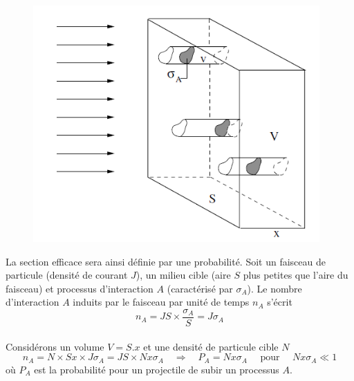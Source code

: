 	\begin{figure}
	\includegraphics[scale=0.35]{ch1/image5.png}
	\end{figure}
La section efficace sera ainsi définie par une probabilité. Soit un faisceau de particule
(densité de courant $J$), un milieu cible (aire $S$ plus petites que l'aire du faisceau)
et processus d'interaction $A$ (caractérisé par $\sigma_A$). Le nombre d'interaction $A$ 
induits par le faisceau par unité de temps $n_A$ s'écrit
\begin{equation}
n_A=JS\times\frac{\sigma_A}{S}=J\sigma_A
\end{equation}\ \\
Considérons un volume $V=S.x$ et une densité de particule cible $N$ 
\begin{equation}
n_A=N\times Sx\times J\sigma_A=JS\times Nx\sigma_A\quad\Rightarrow\quad P_A=Nx\sigma_A
 {\mbox{~~~~pour~~~~}}Nx\sigma_A\ll 1
\end{equation}
où $P_A$ est la probabilité pour un projectile de subir un processus $A$.\\

